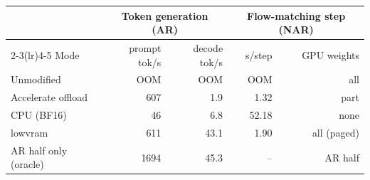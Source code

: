 \begin{tabular}{lrrrr}
\toprule
 & \multicolumn{2}{c}{Token generation (AR)} & \multicolumn{2}{c}{Flow-matching step (NAR)} \\
\cmidrule(lr){2-3}\cmidrule(lr){4-5}
Mode & prompt tok/s & decode tok/s & s/step & GPU weights \\
\midrule
Unmodified & OOM & OOM & OOM & all \\
Accelerate offload & 607 & 1.9 & 1.32 & part \\
CPU (BF16) & 46 & 6.8 & 52.18 & none \\
lowvram & 611 & 43.1 & 1.90 & all (paged) \\
AR half only (oracle) & 1694 & 45.3 & -- & AR half \\
\bottomrule
\end{tabular}

